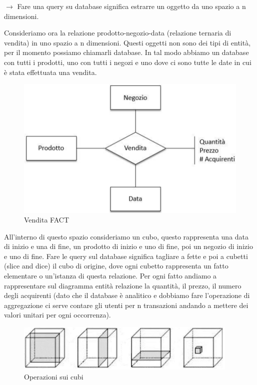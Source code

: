 $\rightarrow$ Fare una query su database significa estrarre un oggetto da uno spazio a n dimensioni. 

Consideriamo ora la relazione prodotto-negozio-data (relazione ternaria di vendita) in uno spazio a n dimensioni. Questi oggetti non sono dei tipi di entità, per il momento possiamo chiamarli database. In tal modo abbiamo un database con tutti i prodotti, uno con tutti i negozi e uno dove ci sono tutte le date in cui è stata effettuata una vendita.  

\begin{center}
\begin{figure}[H]
\centering
\includegraphics[scale=1]{figures/vendita.png}
\caption{Vendita FACT}
\end{figure}
\end{center}

All’interno di questo spazio consideriamo un cubo, questo rappresenta una data di inizio e una di fine, un prodotto di inizio e uno di fine, poi un negozio di inizio e uno di fine. Fare le query sul database significa tagliare a fette e poi a cubetti (slice and dice) il cubo di origine, dove ogni cubetto rappresenta un fatto elementare o un’istanza di questa relazione. Per ogni fatto andiamo a rappresentare sul diagramma entità relazione la quantità, il prezzo, il numero degli acquirenti (dato che il database è analitico e dobbiamo fare l’operazione di aggregazione ci serve contare gli utenti per n transazioni andando a mettere dei valori unitari per ogni occorrenza).  

\begin{center}
\begin{figure}[H]
\centering
\includegraphics[scale=1]{figures/cube_ops.png}
\caption{Operazioni sui cubi}
\end{figure}
\end{center}

